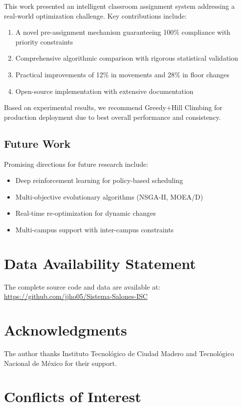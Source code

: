 \documentclass[12pt,a4paper]{article}
\begin{document}
This work presented an intelligent classroom assignment system addressing a real-world optimization challenge. Key contributions include:

\begin{enumerate}
\item A novel pre-assignment mechanism guaranteeing 100\% compliance with priority constraints
\item Comprehensive algorithmic comparison with rigorous statistical validation
\item Practical improvements of 12\% in movements and 28\% in floor changes
\item Open-source implementation with extensive documentation
\end{enumerate}

Based on experimental results, we recommend Greedy+Hill Climbing for production deployment due to best overall performance and consistency.

\subsection{Future Work}

Promising directions for future research include:
\begin{itemize}
\item Deep reinforcement learning for policy-based scheduling
\item Multi-objective evolutionary algorithms (NSGA-II, MOEA/D)
\item Real-time re-optimization for dynamic changes
\item Multi-campus support with inter-campus constraints
\end{itemize}

\section*{Data Availability Statement}

The complete source code and data are available at: \url{https://github.com/jjho05/Sistema-Salones-ISC}

\section*{Acknowledgments}

The author thanks Instituto Tecnológico de Ciudad Madero and Tecnológico Nacional de México for their support.

\section*{Conflicts of Interest}
\end{document}
